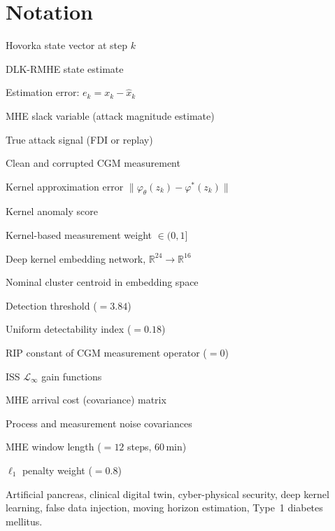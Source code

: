 \documentclass[journal,twoside]{IEEEtran}
\newcommand{\R}{\mathbb{R}}
\newcommand{\ehat}{\hat{e}}
\begin{document}
\section*{Notation}
\begin{IEEEdescription}[\IEEEusemathlabelsep\IEEEsetlabelwidth{$\varphi_\theta$}]
  \item[$x_k\in\R^7$] Hovorka state vector at step $k$
  \item[$\hat x_k$] DLK-RMHE state estimate
  \item[$e_k$] Estimation error: $e_k = x_k - \hat{x}_k$
  \item[$\ehat_k$] MHE slack variable (attack magnitude estimate)
  \item[$a_k$] True attack signal (FDI or replay)
  \item[$y_k,\,\tilde y_k$] Clean and corrupted CGM measurement
  \item[$\varepsilon_k$] Kernel approximation error $\|\varphi_\theta(z_k)-\varphi^*(z_k)\|$
  \item[$s_k$] Kernel anomaly score
  \item[$\rho_k$] Kernel-based measurement weight $\in(0,1]$
  \item[$\varphi_\theta$] Deep kernel embedding network, $\R^{24}\to\R^{16}$
  \item[$c_\mathrm{nom}$] Nominal cluster centroid in embedding space
  \item[$\gamma_\mathrm{th}$] Detection threshold ($=3.84$)
  \item[$\delta_d$] Uniform detectability index ($=0.18$)
  \item[$\delta_s$] RIP constant of CGM measurement operator ($=0$)
  \item[$\gamma_a,\gamma_\varepsilon$] ISS $\mathcal{L}_\infty$ gain functions
  \item[$P_k$] MHE arrival cost (covariance) matrix
  \item[$Q_w,R_v$] Process and measurement noise covariances
  \item[$N_w$] MHE window length ($=12$ steps, 60\,min)
  \item[$\lambda$] $\ell_1$ penalty weight ($=0.8$)
\end{IEEEdescription}


\begin{IEEEkeywords}
Artificial pancreas, clinical digital twin, cyber-physical security,
deep kernel learning, false data injection, moving horizon estimation,
Type~1 diabetes mellitus.
\end{IEEEkeywords}
\end{document}

